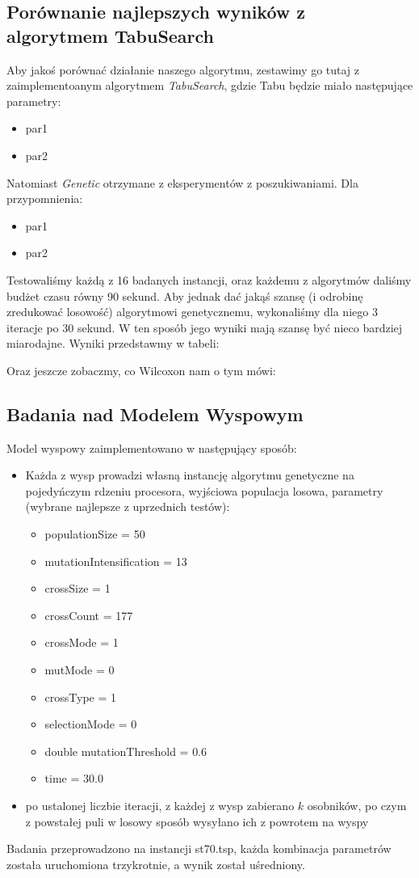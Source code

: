 \documentclass{article}
\begin{document}
\subsection{Porównanie najlepszych wyników z algorytmem TabuSearch}
Aby jakoś porównać działanie naszego algorytmu, zestawimy go tutaj z zaimplementoanym algorytmem \textit{TabuSearch}, gdzie Tabu będzie miało następujące parametry:
\begin{itemize}
	\item par1
	\item par2
\end{itemize}
Natomiast \textit{Genetic} otrzymane z eksperymentów z poszukiwaniami. Dla przypomnienia:
\begin{itemize}
	\item par1
	\item par2
\end{itemize}
Testowaliśmy każdą z 16 badanych instancji, oraz każdemu z algorytmów daliśmy budżet czasu równy 90 sekund. Aby jednak dać jakąś szansę (i odrobinę zredukować losowość) algorytmowi genetycznemu, wykonaliśmy dla niego 3 iteracje po 30 sekund. W ten sposób jego wyniki mają szansę być nieco bardziej miarodajne. Wyniki przedstawmy w tabeli:

Oraz jeszcze zobaczmy, co Wilcoxon nam o tym mówi:

\subsection{Badania nad Modelem Wyspowym}
Model wyspowy zaimplementowano w następujący sposób:
\begin{itemize}
	\item Każda z wysp prowadzi własną instancję algorytmu genetyczne na pojedyńczym rdzeniu procesora, wyjściowa populacja losowa, parametry (wybrane najlepsze z uprzednich testów):
	\begin{itemize}
		\item populationSize = 50
		\item mutationIntensification = 13
		\item crossSize = 1
		\item crossCount = 177
		\item crossMode = 1
		\item mutMode = 0
		\item crossType = 1
		\item selectionMode = 0
    		\item double mutationThreshold = 0.6
    		\item time = 30.0
	\end{itemize}
	\item po ustalonej liczbie iteracji, z każdej z wysp zabierano $k$ osobników, po czym z powstałej puli w losowy sposób wysyłano ich z powrotem na wyspy
\end{itemize}
Badania przeprowadzono na instancji st70.tsp, każda kombinacja parametrów została uruchomiona trzykrotnie, a wynik został uśredniony.
\end{document}
